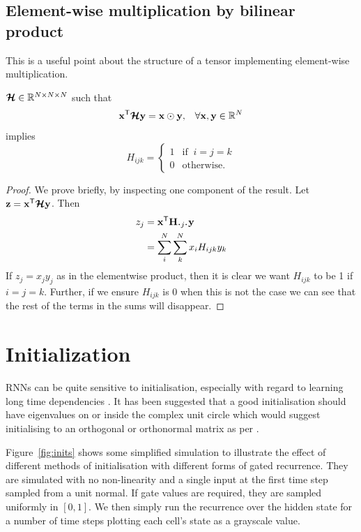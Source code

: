 \section{Element-wise multiplication by bilinear product}
This is a useful point about the structure of a tensor implementing element-wise
multiplication.
\begin{prop}  \label{prop:identity}
	\(\bm{\mathcal{H}} \in \mathbb{R}^{N \times N \times N}\) such that
\begin{align}
\mathbf{x}^\mathsf{T}\bm{\mathcal{H}}\mathbf{y} = \mathbf{x} \odot \mathbf{y}, 
&&\forall \mathbf{x},\mathbf{y} \in \mathbb{R}^{N}
\end{align} implies
\begin{equation}
	H_{ijk} = \begin{cases}
		1 & \text{if}\;\;i = j = k \\
		0 & \text{otherwise.}
	\end{cases}
\end{equation}

\end{prop}
\begin{proof}
We prove briefly, by inspecting one component of the result. Let 
\(\mathbf{z} = \mathbf{x}^\mathsf{T}\bm{\mathcal{H}}\mathbf{y}\). Then
\begin{align}
	z_j &= \vec{x}^\mathsf{T}\mat{H}_{\midbullet j \midbullet}\vec{y} \\
		&= \sum_i^N\sum_k^N x_iH_{ijk}y_k
\end{align}
If \(z_j = x_jy_j\) as in the elementwise product, then it is clear we want \(H_{ijk}\) to be 
1 if \(i=j=k\). Further, if we ensure \(H_{ijk}\) is 0 when this is not the case we can see that
the rest of the terms in the sums will disappear.
\end{proof}

\chapter{Initialization}
RNNs can be quite sensitive to initialisation, especially with regard to learning long
time dependencies \autocite{Le2015}. It has been suggested that a good initialisation should
have eigenvalues on or inside the complex unit circle \autocite{Zilly2016, Mikolov2015} which
would suggest initialising to an orthogonal or orthonormal matrix as per \autocite{Henaff2016}.

Figure~\ref{fig:inits} shows some simplified simulation to illustrate the effect of
different methods of initialisation with different forms of gated recurrence. They are
simulated with no non-linearity and a single input at the first time step sampled from a unit
normal. If gate values are required, they are sampled uniformly in \([0,1]\). We then simply
run the recurrence over the hidden state for a number of time steps plotting each cell's state
as a grayscale value.

